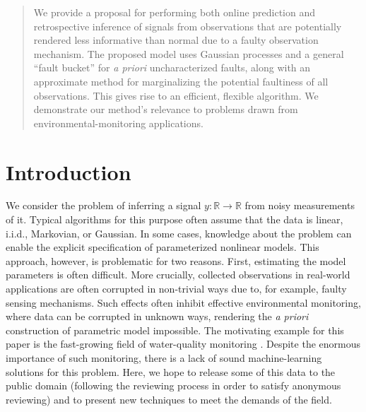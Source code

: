 \documentclass{article}
\newcommand{\R}{\ensuremath{\mathbb{R}}}
\begin{document}

\begin{abstract}
  We provide a proposal for performing both online prediction and
  retrospective inference of signals from observations that are
  potentially rendered less informative than normal due to a faulty
  observation mechanism.  The proposed model uses Gaussian processes
  and a general ``fault bucket'' for \textit{a priori} uncharacterized
  faults, along with an approximate method for marginalizing the
  potential faultiness of all observations. This gives rise to an
  efficient, flexible algorithm. We demonstrate our method's relevance
  to problems drawn from environmental-monitoring
  applications.
\end{abstract}

\section{Introduction}

We consider the problem of inferring a signal $y\colon \R \to \R$ from
noisy measurements of it.  Typical algorithms for this purpose often
assume that the data is linear, i.i.d., Markovian, or Gaussian. In
some cases, knowledge about the problem can enable the explicit
specification of parameterized nonlinear models. This approach,
however, is problematic for two reasons. First, estimating the model
parameters is often difficult. More crucially, collected observations
in real-world applications are often corrupted in non-trivial ways due
to, for example, faulty sensing mechanisms. Such effects often
inhibit effective environmental monitoring, where data can be
corrupted in unknown ways, rendering the \emph{a priori} construction
of parametric model impossible. The motivating example for this paper
is the fast-growing field of water-quality monitoring
\citep{wagner2006guidelines}. Despite the enormous importance of
such monitoring, there is a lack of sound
machine-learning solutions for this problem. Here, we hope to release some of this data to the public domain
(following the reviewing process in order to satisfy anonymous
reviewing) and to present new techniques to meet the
demands of the field.
\end{document}

